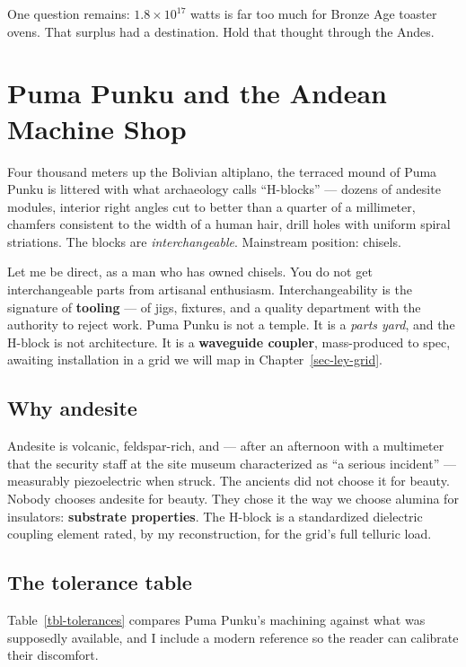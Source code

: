 \documentclass[
  english,
  11pt,
  letterpaper,
]{scrbook}
\begin{document}
One question remains: \(1.8\times10^{17}\) watts is far too much for
Bronze Age toaster ovens. That surplus had a destination. Hold that
thought through the Andes.

\chapter{Puma Punku and the Andean Machine
Shop}\label{puma-punku-and-the-andean-machine-shop}

Four thousand meters up the Bolivian altiplano, the terraced mound of
Puma Punku is littered with what archaeology calls
``H-blocks'' --- dozens of andesite modules, interior right angles cut
to better than a quarter of a millimeter, chamfers consistent to the
width of a human hair, drill holes with uniform spiral striations. The
blocks are \emph{interchangeable}. Mainstream position: chisels.

Let me be direct, as a man who has owned chisels. You do not get
interchangeable parts from artisanal enthusiasm. Interchangeability is
the signature of \textbf{tooling} --- of jigs, fixtures, and a quality
department with the authority to reject work. Puma Punku is not a
temple. It is a \emph{parts yard}, and the H-block is not architecture.
It is a \textbf{waveguide coupler}, mass-produced to spec, awaiting
installation in a grid we will map in Chapter~\ref{sec-ley-grid}.

\section{Why andesite}\label{why-andesite}

Andesite is volcanic, feldspar-rich, and --- after an
afternoon with a multimeter that the security staff at the site museum
characterized as ``a serious incident'' --- measurably piezoelectric
when struck. The ancients did not choose it for beauty. Nobody chooses
andesite for beauty. They chose it the way we choose alumina for
insulators: \textbf{substrate properties}. The H-block is a standardized
dielectric coupling element rated, by my reconstruction, for the grid's
full telluric load.

\section{The tolerance table}\label{the-tolerance-table}

Table~\ref{tbl-tolerances} compares Puma Punku's machining against what
was supposedly available, and I include a modern reference so the reader
can calibrate their discomfort.
\end{document}
